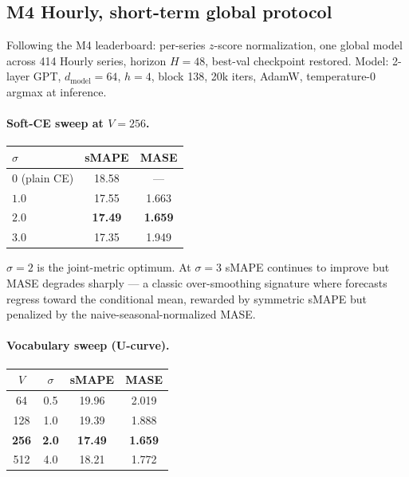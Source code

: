 \documentclass[11pt]{article}
\theoremstyle{remark}
\begin{document}
\subsection{M4 Hourly, short-term global protocol}

Following the M4 leaderboard: per-series $z$-score normalization, one
global model across 414 Hourly series, horizon $H = 48$, best-val
checkpoint restored. Model: 2-layer GPT, $d_{\text{model}} = 64$,
$h = 4$, block 138, 20k iters, AdamW, temperature-0 argmax at inference.

\paragraph{Soft-CE sweep at $V = 256$.}
\begin{center}
\begin{tabular}{lcc}
\toprule
$\sigma$ & sMAPE & MASE \\
\midrule
$0$ (plain CE) & 18.58 & --- \\
$1.0$ & 17.55 & 1.663 \\
$2.0$ & \textbf{17.49} & \textbf{1.659} \\
$3.0$ & 17.35 & 1.949 \\
\bottomrule
\end{tabular}
\end{center}

$\sigma = 2$ is the joint-metric optimum. At $\sigma = 3$ sMAPE
continues to improve but MASE degrades sharply --- a classic
over-smoothing signature where forecasts regress toward the
conditional mean, rewarded by symmetric sMAPE but penalized by the
naive-seasonal-normalized MASE.

\paragraph{Vocabulary sweep (U-curve).}
\begin{center}
\begin{tabular}{cccc}
\toprule
$V$ & $\sigma$ & sMAPE & MASE \\
\midrule
64  & 0.5 & 19.96 & 2.019 \\
128 & 1.0 & 19.39 & 1.888 \\
\textbf{256} & \textbf{2.0} & \textbf{17.49} & \textbf{1.659} \\
512 & 4.0 & 18.21 & 1.772 \\
\bottomrule
\end{tabular}
\end{center}
\end{document}
